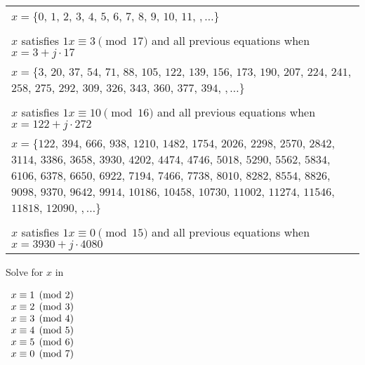 \begin{tabular}[t]{p{7in}}
\(x = \{\)\(0\), \(1\), \(2\), \(3\), \(4\), \(5\), \(6\), \(7\), \(8\), \(9\), \(10\), \(11\), \(, \dots\}\) \\
\\ \(x\) satisfies \(1 x \equiv 3 \pmod {17}\) and all previous equations
when \(x = 3 + j \cdot 17\) \\
\(x = \{\)\(3\), \(20\), \(37\), \(54\), \(71\), \(88\), \(105\), \(122\), \(139\), \(156\), \(173\), \(190\), \(207\), \(224\), \(241\), \(258\), \(275\), \(292\), \(309\), \(326\), \(343\), \(360\), \(377\), \(394\), \(, \dots\}\) \\
\\ \(x\) satisfies \(1 x \equiv 10 \pmod {16}\) and all previous equations
when \(x = 122 + j \cdot 272\) \\
\(x = \{\)\(122\), \(394\), \(666\), \(938\), \(1210\), \(1482\), \(1754\), \(2026\), \(2298\), \(2570\), \(2842\), \(3114\), \(3386\), \(3658\), \(3930\), \(4202\), \(4474\), \(4746\), \(5018\), \(5290\), \(5562\), \(5834\), \(6106\), \(6378\), \(6650\), \(6922\), \(7194\), \(7466\), \(7738\), \(8010\), \(8282\), \(8554\), \(8826\), \(9098\), \(9370\), \(9642\), \(9914\), \(10186\), \(10458\), \(10730\), \(11002\), \(11274\), \(11546\), \(11818\), \(12090\), \(, \dots\}\) \\
\\ \(x\) satisfies \(1 x \equiv 0 \pmod {15}\) and all previous equations
when \(x = 3930 + j \cdot 4080\) \\
\end{tabular}

\item Solve for \(x\) in

\(
\begin{array}[t]{l}
x \equiv 1 \pmod 2 \\
x \equiv 2 \pmod 3 \\
x \equiv 3 \pmod 4 \\
x \equiv 4 \pmod 5 \\
x \equiv 5 \pmod 6 \\
x \equiv 0 \pmod 7 \\
\end{array}
\)

